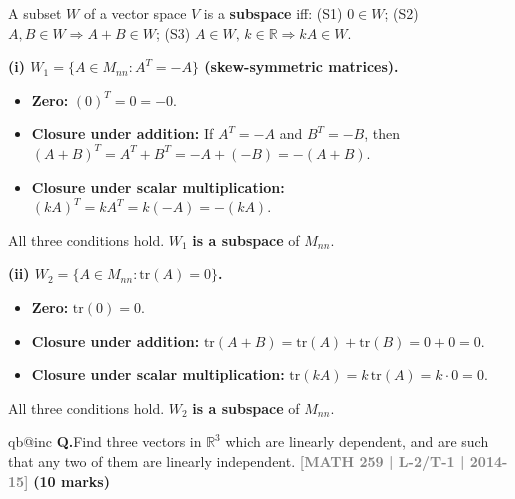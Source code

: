 \documentclass[12pt,a3paper]{article}
\makeatletter
\newcommand{\yr}[1]{\hfill\textcolor{gray}{\small\textbf{[#1]}}}
\newcommand{\mk}[1]{\textcolor{orange!70!black}{\small\textbf{(#1 marks)}}}
\newcounter{qnum}
\newcommand{\Q}[1]{%
  \csname qb@inc\endcsname
  \needspace{4\baselineskip}
  \refstepcounter{qnum}
  \vspace{6pt}
  \noindent\textbf{Q\theqnum.}\enspace #1\par
}
\makeatother
\begin{document}
\begin{tcolorbox}[enhanced,breakable,colback=cC!4,colframe=cC,
  boxrule=0.8pt,arc=5pt,
  title={\textbf{Answer}},
  fonttitle=\bfseries\color{white},colbacktitle=cC]

A subset $W$ of a vector space $V$ is a \textbf{subspace} iff: (S1) $0\in W$; (S2) $A,B\in W\Rightarrow A+B\in W$; (S3) $A\in W,\,k\in\mathbb{R}\Rightarrow kA\in W$.

\medskip
\textbf{(i) $W_1 = \{A\in M_{nn} : A^T = -A\}$ (skew-symmetric matrices).}

\begin{itemize}[itemsep=2pt]
  \item \textbf{Zero:} $(0)^T = 0 = -0$. \checkmark
  \item \textbf{Closure under addition:} If $A^T=-A$ and $B^T=-B$, then $(A+B)^T = A^T+B^T = -A+(-B) = -(A+B)$. \checkmark
  \item \textbf{Closure under scalar multiplication:} $(kA)^T = kA^T = k(-A) = -(kA)$. \checkmark
\end{itemize}
All three conditions hold. $W_1$ \textbf{is a subspace} of $M_{nn}$.

\medskip
\textbf{(ii) $W_2 = \{A\in M_{nn} : \mathrm{tr}(A) = 0\}$.}

\begin{itemize}[itemsep=2pt]
  \item \textbf{Zero:} $\mathrm{tr}(0) = 0$. \checkmark
  \item \textbf{Closure under addition:} $\mathrm{tr}(A+B)=\mathrm{tr}(A)+\mathrm{tr}(B)=0+0=0$. \checkmark
  \item \textbf{Closure under scalar multiplication:} $\mathrm{tr}(kA)=k\,\mathrm{tr}(A)=k\cdot 0=0$. \checkmark
\end{itemize}
All three conditions hold. $W_2$ \textbf{is a subspace} of $M_{nn}$.
\end{tcolorbox}

\Q{Find three vectors in $\mathbb{R}^3$ which are linearly dependent, and are such that any two of them are linearly independent.
\yr{MATH 259 | L-2/T-1 | 2014-15} \mk{10}}
\end{document}

